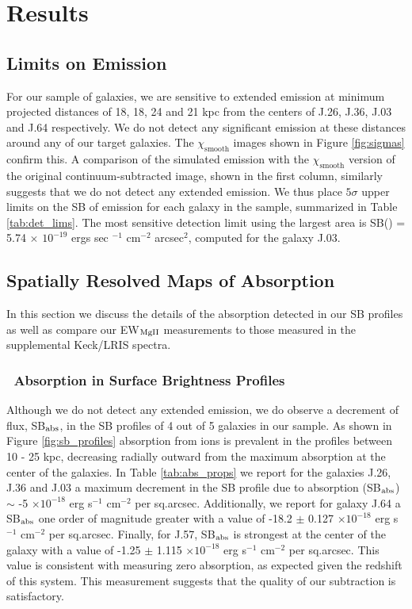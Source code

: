 \documentclass[twocolumn]{aastex61}
\begin{document}
\section{Results}\label{sec:results}

\subsection{Limits on  Emission}
For our sample of galaxies, we are sensitive to extended emission at minimum projected distances of 
18, 18, 24 and 21 kpc from the centers of J.26, J.36, J.03 and J.64 respectively. We do not detect any significant  emission at these distances around any of our target galaxies. The $\chi_{\text{smooth}}$ images shown in Figure \ref{fig:sigmas} confirm this. A comparison of the simulated emission with the $\chi_{\text{smooth}}$ version of the original continuum-subtracted image, shown in the first column, similarly suggests that we do not detect any extended  emission. We thus place $5\sigma$ upper limits on the SB of  emission for each galaxy in the sample, summarized in Table \ref{tab:det_lims}. The most sensitive detection limit using the largest area is SB() = 5.74 $\times$ $10^{-19}$ ergs sec $^{-1}$ cm$^{-2}$ arcsec$^2$, computed for the galaxy J.03. 

\subsection{Spatially Resolved Maps of  Absorption}
In this section we discuss the details of the absorption detected in our SB profiles as well as compare our EW$_{\rm{MgII}}$ measurements to those measured in the supplemental Keck/LRIS spectra. 

\subsubsection{\ Absorption in Surface Brightness Profiles} \label{subsubsec:SBprofiles}
Although we do not detect any extended  emission, we do observe a decrement of flux, SB$_{\rm abs}$, in the SB profiles of 4 out of 5 galaxies in our sample. As shown in Figure \ref{fig:sb_profiles} absorption from  ions is prevalent in the profiles between 10 - 25 kpc, decreasing radially outward from the maximum absorption at the center of the galaxies. In Table \ref{tab:abs_props} we report for the galaxies J.26, J.36 and J.03 a maximum decrement in the SB profile due to absorption (SB$_{\rm abs}$) $\sim$ -5 $\times10^{-18}$ erg s$^{-1}$ cm$^{-2}$ per sq.arcsec. Additionally, we report for galaxy J.64 a SB$_{\rm abs}$ one order of magnitude greater with a value of -18.2 $\pm$ 0.127 $\times10^{-18}$ erg s$^{-1}$ cm$^{-2}$ per sq.arcsec. Finally, for J.57, SB$_{\rm abs}$ is strongest at the center of the galaxy with a value of -1.25 $\pm$ 1.115 $\times10^{-18}$ erg s$^{-1}$ cm$^{-2}$ per sq.arcsec. This value is consistent with measuring zero absorption, as expected given the redshift of this system. This measurement suggests that the quality of our subtraction is satisfactory.
\end{document}
